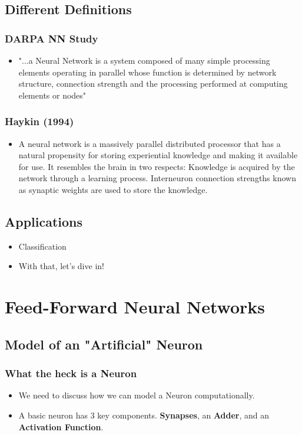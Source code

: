 \documentclass{beamer}
\begin{document}
\subsection{Different Definitions}
\begin{frame}
\frametitle{DARPA NN Study}
\begin{itemize}
	\item "...a Neural Network is a system composed of many simple processing elements operating in parallel whose function is determined by network structure, connection strength and the processing performed at computing elements or nodes"
\end{itemize}
\end{frame}

\begin{frame}
\frametitle{Haykin (1994)}
\begin{itemize}
\item A neural network is a massively parallel distributed processor that has a natural propensity for storing experiential knowledge and making it available for use. It resembles the brain in two respects: 
  Knowledge is acquired by the network through a learning process. 
  Interneuron connection strengths known as synaptic weights are used to store the knowledge.
\end{itemize}
\end{frame}
\subsection{Applications}
\begin{frame}
\begin{itemize}
\item Classification
\end{itemize}
\end{frame}

\begin{frame}
\begin{itemize}
\item With that, let's dive in!
\end{itemize}
\end{frame}

\section{Feed-Forward Neural Networks}
\subsection{Model of an "Artificial" Neuron}
\begin{frame}
\frametitle{What the heck is a Neuron}
\begin{itemize}
	\item We need to discuss how we can model a Neuron computationally. 
    \item A basic neuron has 3 key components. \textbf{Synapses}, an \textbf{Adder}, and an \textbf{Activation Function}.
\end{itemize}

\end{frame}
\end{document}
